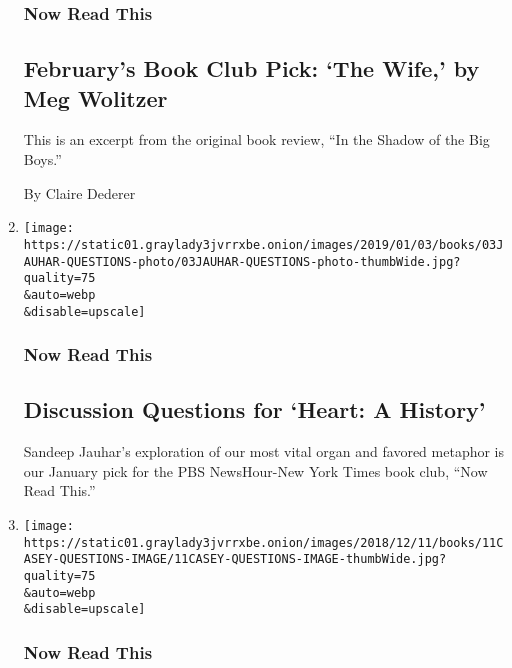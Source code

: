 \begin{enumerate}
  \hypertarget{now-read-this-4}{%
  \subsubsection{Now Read This}\label{now-read-this-4}}

  \hypertarget{februarys-book-club-pick-the-wife-by-meg-wolitzer}{%
  \subsection{February's Book Club Pick: `The Wife,' by Meg
  Wolitzer}\label{februarys-book-club-pick-the-wife-by-meg-wolitzer}}

  This is an excerpt from the original book review, ``In the Shadow of
  the Big Boys.''

  By Claire Dederer
\item
  \href{/2019/01/03/books/discussion-questions-heart-sandeep-jauhar.html}{}

  \texttt{[image: https://static01.graylady3jvrrxbe.onion/images/2019/01/03/books/03JAUHAR-QUESTIONS-photo/03JAUHAR-QUESTIONS-photo-thumbWide.jpg?quality=75\\\&auto=webp\\\&disable=upscale]}

  \hypertarget{now-read-this-5}{%
  \subsubsection{Now Read This}\label{now-read-this-5}}

  \hypertarget{discussion-questions-for-heart-a-history}{%
  \subsection{Discussion Questions for `Heart: A
  History'}\label{discussion-questions-for-heart-a-history}}

  Sandeep Jauhar's exploration of our most vital organ and favored
  metaphor is our January pick for the PBS NewsHour-New York Times book
  club, ``Now Read This.''
\item
  \href{/2018/12/11/books/casey-gerald-there-will-be-no-miracles-here-now-read-this-questions.html}{}

  \texttt{[image: https://static01.graylady3jvrrxbe.onion/images/2018/12/11/books/11CASEY-QUESTIONS-IMAGE/11CASEY-QUESTIONS-IMAGE-thumbWide.jpg?quality=75\\\&auto=webp\\\&disable=upscale]}

  \hypertarget{now-read-this-6}{%
  \subsubsection{Now Read This}\label{now-read-this-6}}


\end{enumerate}
